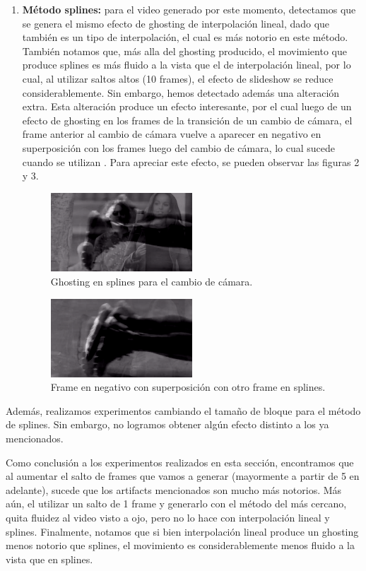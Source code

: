 \begin{enumerate}
\item \textbf{M\'etodo splines:} para el video generado por este momento, detectamos que se genera el mismo efecto de ghosting de interpolaci\'on lineal, dado que tambi\'en es un tipo de interpolaci\'on, el cual es m\'as notorio en este m\'etodo. Tambi\'en notamos que, m\'as alla del ghosting producido, el movimiento que produce splines es m\'as fluido a la vista que el de interpolaci\'on lineal, por lo cual, al utilizar saltos altos (10 frames), el efecto de slideshow se reduce considerablemente. Sin embargo, hemos detectado adem\'as una alteraci\'on extra. Esta alteraci\'on produce un efecto interesante, por el cual luego de un efecto de ghosting en los frames de la transici\'on de un cambio de c\'amara, el frame anterior al cambio de c\'amara vuelve a aparecer en negativo en superposici\'on con los frames luego del cambio de c\'amara, lo cual sucede cuando se utilizan . Para apreciar este efecto, se pueden observar las figuras 2 y 3.

\begin{figure}[H]
  \centering
    \includegraphics[width=0.5\textwidth]{img/ghosting_splines_1.png}
  	\caption{Ghosting en splines para el cambio de c\'amara.}
\end{figure}

\begin{figure}[H]
  \centering
    \includegraphics[width=0.5\textwidth]{img/ghosting_negative.png}
  	\caption{Frame en negativo con superposici\'on con otro frame en splines.}
\end{figure}

\end{enumerate}

Adem\'as, realizamos experimentos cambiando el tama\~no de bloque para el m\'etodo de splines. Sin embargo, no logramos obtener alg\'un efecto distinto a los ya mencionados. 

Como conclusi\'on a los experimentos realizados en esta secci\'on, encontramos que al aumentar el salto de frames que vamos a generar (mayormente a partir de 5 en adelante), sucede que los artifacts mencionados son mucho m\'as notorios. M\'as a\'un, el utilizar un salto de 1 frame y generarlo con el m\'etodo del m\'as cercano, quita fluidez al video visto a ojo, pero no lo hace con interpolaci\'on lineal y splines. Finalmente, notamos que si bien interpolaci\'on lineal produce un ghosting menos notorio que splines, el movimiento es considerablemente menos fluido a la vista que en splines.
